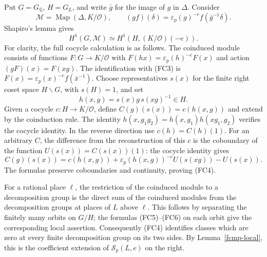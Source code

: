 Put $G=G_{\mathbb Q}$, $H=G_L$, and write $\bar g$ for
the image of $g$ in $\Delta$. Consider
\[
 \mathcal M=\operatorname{Map}(\Delta,K/\mathcal O),\qquad
 (g f)(\delta)=\varepsilon_p(g)^{-e}
                                      f(\bar g^{-1}\delta).
                                                               \tag{FC3}
\]
Shapiro's lemma gives
\[
 H^1(G,\mathcal M)\simeq
 H^1(H,(K/\mathcal O)(-e)).
                                                               \tag{FC4}
\]
For clarity, the full cocycle calculation is as follows.
The coinduced module consists of functions $F:G\to K/\mathcal O$
with $F(hx)=\varepsilon_p(h)^{-e}F(x)$ and action
$(gF)(x)=F(xg)$. The identification with (FC3) is
$F(x)=\varepsilon_p(x)^{-e}f(\bar x^{-1})$.
Choose representatives $s(x)$ for the finite right coset
space $H\backslash G$, with $s(H)=1$, and set
\[
 h(x,g)=s(x)g\,s(xg)^{-1}\in H.
                                                               \tag{FC5}
\]
Given a cocycle $c:H\to K/\mathcal O$, define
$C(g)(s(x))=c(h(x,g))$ and extend by the coinduction rule.
The identity
$h(x,g_1g_2)=h(x,g_1)h(xg_1,g_2)$ verifies the cocycle
identity. In the reverse direction use $c(h)=C(h)(1)$.
For an arbitrary $C$, the difference from the reconstruction
of this $c$ is the coboundary of the function
$U(s(x))=C(s(x))(1)$: the cocycle identity gives
\[
 C(g)(s(x))=c(h(x,g))
       +\varepsilon_p(h(x,g))^{-e}U(s(xg))-U(s(x)).
                                                               \tag{FC6}
\]
The formulas preserve coboundaries and continuity, proving
(FC4).

For a rational place $\ell$, the restriction of the coinduced
module to a decomposition group is the direct sum of the
coinduced modules from the decomposition groups at places
of $L$ above $\ell$. This follows by separating the finitely
many orbits on $G/H$; the formulas (FC5)--(FC6) on each
orbit give the corresponding local assertion. Consequently
(FC4) identifies classes which are zero at every finite
decomposition group on its two sides. By
Lemma~\ref{fcmp-local}, this is the coefficient extension of
$\mathcal S_p(L,e)$ on the right.

